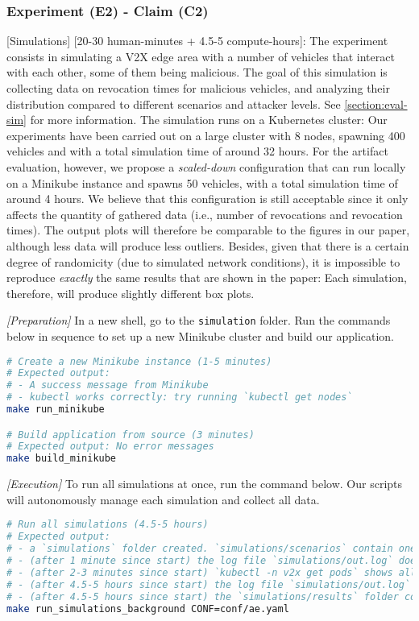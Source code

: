 \subsubsection{Experiment (E2) - Claim (C2)}
\label{artifact:simulations}
[Simulations] [20-30 human-minutes + 4.5-5 compute-hours]: The experiment
consists in simulating a \acs{V2X} edge area with a number of vehicles that
interact with each other, some of them being malicious. The goal of this
simulation is collecting data on revocation times for malicious vehicles, and
analyzing their distribution compared to different scenarios and attacker
levels. See \cref{section:eval-sim} for more information. The simulation runs on
a Kubernetes cluster: Our experiments have been carried out on a large cluster
with 8 nodes, spawning 400 vehicles and with a total simulation time of around
32 hours. For the artifact evaluation, however, we propose a \emph{scaled-down}
configuration that can run locally on a Minikube instance and spawns 50
vehicles, with a total simulation time of around 4 hours. We believe that this
configuration is still acceptable since it only affects the quantity of gathered
data (i.e., number of revocations and revocation times). The output plots will
therefore be comparable to the figures in our paper, although less data will
produce less outliers. Besides, given that there is a certain degree of
randomicity (due to simulated network conditions), it is impossible to reproduce
\emph{exactly} the same results that are shown in the paper: Each simulation,
therefore, will produce slightly different box plots.

\textit{[Preparation]} In a new shell, go to the \texttt{simulation} folder. Run
the commands below in sequence to set up a new Minikube cluster and build our
application.

\begin{lstlisting}[language=bash]
# Create a new Minikube instance (1-5 minutes)
# Expected output:
# - A success message from Minikube
# - kubectl works correctly: try running `kubectl get nodes`
make run_minikube

# Build application from source (3 minutes)
# Expected output: No error messages
make build_minikube
\end{lstlisting}

\textit{[Execution]} To run all simulations at once, run the command below. Our
scripts will autonomously manage each simulation and collect all data.

\begin{lstlisting}[language=bash]
# Run all simulations (4.5-5 hours)
# Expected output:
# - a `simulations` folder created. `simulations/scenarios` contain one file for each run (16 in total)
# - (after 1 minute since start) the log file `simulations/out.log` does not show errors and is "SLEEPING"
# - (after 2-3 minutes since start) `kubectl -n v2x get pods` shows all pods in "Running" state
# - (after 4.5-5 hours since start) the log file `simulations/out.log` shows "ALL DONE" as last message
# - (after 4.5-5 hours since start) the `simulations/results` folder contains one file for each run (16 in total)
make run_simulations_background CONF=conf/ae.yaml
\end{lstlisting}

